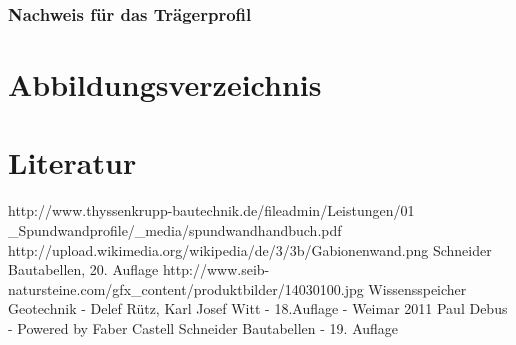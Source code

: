 \documentclass[11pt,fleqn,a4paper,halfparskip]{article}
\begin{document}
\subsubsection{Nachweis für das Trägerprofil}





\newpage
\section{Abbildungsverzeichnis}
\listoffigures
\newpage
\section{Literatur}
\begin{thebibliography}{9}
http://www.thyssenkrupp-bautechnik.de/fileadmin/Leistungen/01 \_Spundwandprofile/\_media/spundwandhandbuch.pdf
 http://upload.wikimedia.org/wikipedia/de/3/3b/Gabionenwand.png
 Schneider Bautabellen, 20. Auflage
 http://www.seib-natursteine.com/gfx\_content/produktbilder/14030100.jpg
 Wissensspeicher Geotechnik - Delef Rütz, Karl Josef Witt - 18.Auflage - Weimar 2011
 Paul Debus - Powered by Faber Castell
 Schneider Bautabellen - 19. Auflage
\end{thebibliography}
\end{document}
